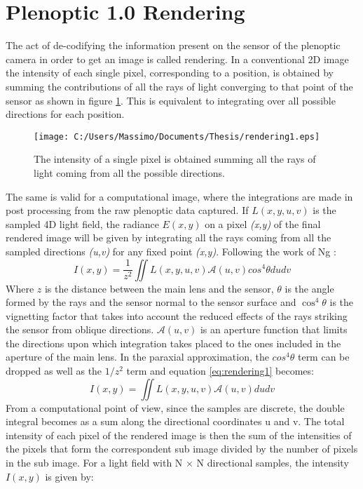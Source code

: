 \section{Plenoptic 1.0 Rendering}
\label{sec:rendering1}
The act of de-codifying the information present on the sensor of the plenoptic camera in order to get an image is called rendering. 
In a conventional 2D image the intensity of each single pixel, corresponding to a position, is obtained by summing the contributions of all the rays of light converging to that point of the sensor \cite{georgiev2010focused} as shown in figure \ref{fig:render1}. This is equivalent to integrating over all possible directions for each position. 
\begin{figure}[H]
	\centering
	\texttt{[image: C:/Users/Massimo/Documents/Thesis/rendering1.eps]}
	\caption{\label{fig:render1} The intensity of a single pixel is obtained summing all the rays of light coming from all the possible directions.\cite{ng2006digital} }
\end{figure}
The same is valid for a computational image, where the integrations are made in post processing from the raw plenoptic data captured.
 If $L(x,y,u,v)$ is the sampled 4D light field, the radiance $E(x,y)$ on a pixel \textit{(x,y)} of the final rendered image will be given by integrating all the rays coming from all the sampled directions \textit{(u,v)} for any fixed point\textit{ (x,y)}. Following the work of Ng \cite{ng2006digital}:
\begin{equation}
\label{eq:rendering1}
I(x,y)=\dfrac{1}{z^2}\iint L(x,y,u,v)\mathscr{A}(u,v)cos^4\theta dudv
\end{equation} 
Where $z$ is the distance between the main lens and the sensor, $\theta$ is the angle formed by the rays and the sensor normal to the sensor surface and $\cos^4\theta$ is the vignetting factor that takes into account the reduced effects of the rays striking the sensor from oblique directions. $\mathscr{A}(u,v)$ is an aperture function that limits the directions upon which integration takes placed to the ones included in the aperture of the main lens. In the paraxial approximation, the $cos^4\theta$ term can be dropped as well as the $1/z^2$ term and equation \ref{eq:rendering1} becomes:
\begin{equation}
\label{eq:rendering2}
I(x,y)=\iint L(x,y,u,v)\mathscr{A}(u,v) dudv
\end{equation}
From a computational point of view, since the samples are discrete, the double integral becomes as a sum along the directional coordinates u and v. The total intensity of each pixel of the rendered image is then the sum of the intensities of the pixels that form the correspondent sub image divided by the number of pixels in the sub image. For a light field with N $\times$ N directional samples, the intensity $I(x,y)$ is given by:

